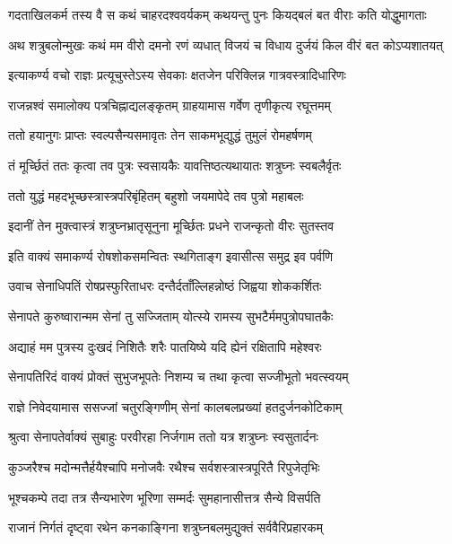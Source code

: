 \twolineshloka
{गदताखिलकर्म तस्य वै स कथं चाहरदश्ववर्यकम्}
{कथयन्तु पुनः कियद्बलं बत वीराः कति योद्धुमागताः}%

\twolineshloka
{अथ शत्रुबलोन्मुखः कथं मम वीरो दमनो रणं व्यधात्}
{विजयं च विधाय दुर्जयं किल वीरं बत कोऽप्यशातयत्}%

\twolineshloka
{इत्याकर्ण्य वचो राज्ञः प्रत्यूचुस्तेऽस्य सेवकाः}
{क्षतजेन परिक्लिन्न गात्रवस्त्रादिधारिणः}%

\twolineshloka
{राजन्नश्वं समालोक्य पत्रचिह्नाद्यलङ्कृतम्}
{ग्राहयामास गर्वेण तृणीकृत्य रघूत्तमम्}%

\twolineshloka
{ततो हयानुगः प्राप्तः स्वल्पसैन्यसमावृतः}
{तेन साकमभूद्युद्धं तुमुलं रोमहर्षणम्}%

\twolineshloka
{तं मूर्च्छितं ततः कृत्वा तव पुत्रः स्वसायकैः}
{यावत्तिष्ठत्यथायातः शत्रुघ्नः स्वबलैर्वृतः}%

\twolineshloka
{ततो युद्धं महदभूच्छस्त्रास्त्रपरिबृंहितम्}
{बहुशो जयमापेदे तव पुत्रो महाबलः}%

\twolineshloka
{इदानीं तेन मुक्त्वास्त्रं शत्रुघ्नभ्रातृसूनुना}
{मूर्च्छितः प्रधने राजन्कृतो वीरः सुतस्तव}%

\twolineshloka
{इति वाक्यं समाकर्ण्य रोषशोकसमन्वितः}
{स्थगिताङ्ग इवासीत्स समुद्र इव पर्वणि}%

\twolineshloka
{उवाच सेनाधिपतिं रोषप्रस्फुरिताधरः}
{दन्तैर्दताँल्लिहन्नोष्ठं जिह्वया शोककर्शितः}%

\twolineshloka
{सेनापते कुरुष्वारान्मम सेनां तु सज्जिताम्}
{योत्स्ये रामस्य सुभटैर्ममपुत्रोपघातकैः}%

\twolineshloka
{अद्याहं मम पुत्रस्य दुःखदं निशितैः शरैः}
{पातयिष्ये यदि ह्येनं रक्षितापि महेश्वरः}%

\twolineshloka
{सेनापतिरिदं वाक्यं प्रोक्तं सुभुजभूपतेः}
{निशम्य च तथा कृत्वा सज्जीभूतो भवत्स्वयम्}%

\twolineshloka
{राज्ञे निवेदयामास ससज्जां चतुरङ्गिणीम्}
{सेनां कालबलप्रख्यां हतदुर्जनकोटिकाम्}%

\twolineshloka
{श्रुत्वा सेनापतेर्वाक्यं सुबाहुः परवीरहा}
{निर्जगाम ततो यत्र शत्रुघ्नः स्वसुतार्दनः}%

\twolineshloka
{कुञ्जरैश्च मदोन्मत्तैर्हयैश्चापि मनोजवैः}
{रथैश्च सर्वशस्त्रास्त्रपूरितै रिपुजेतृभिः}%

\twolineshloka
{भूश्चकम्पे तदा तत्र सैन्यभारेण भूरिणा}
{सम्मर्दः सुमहानासीत्तत्र सैन्ये विसर्पति}%

\twolineshloka
{राजानं निर्गतं दृष्ट्वा रथेन कनकाङ्गिना}
{शत्रुघ्नबलमुद्युक्तं सर्ववैरिप्रहारकम्}%

